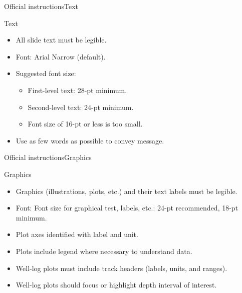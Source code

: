 \documentclass[10pt,xcolor={dvipsnames},aspectratio=169]{beamer}
\begin{document}
\begin{frame}{Official instructions}{Text}
\begin{block}{Text}
  \begin{itemize}
    \item All slide text must be legible.
    \item Font: Arial Narrow (default).
    \item Suggested font size: 
    \begin{itemize}
      \item First-level text: 28-pt minimum.
      \small \item Second-level text: 24-pt minimum.
      \footnotesize \item Font size of 16-pt or less is too small.
    \end{itemize}
    \item Use as few words as possible to convey message.
  \end{itemize}
\end{block}
\end{frame}

\begin{frame}{Official instructions}{Graphics}
\begin{block}{Graphics}
  \begin{itemize}
    \item Graphics (illustrations, plots, etc.) and their text labels must be legible.
    \item Font: Font size for graphical test, labels, etc.: 24-pt recommended, 18-pt minimum.
    \item Plot axes identified with label and unit.
    \item Plots include legend where necessary to understand data.
    \item Well-log plots must include track headers (labels, units, and ranges).
    \item Well-log plots should focus or highlight depth interval of interest.
  \end{itemize}
\end{block}
\end{frame}

\end{document}

